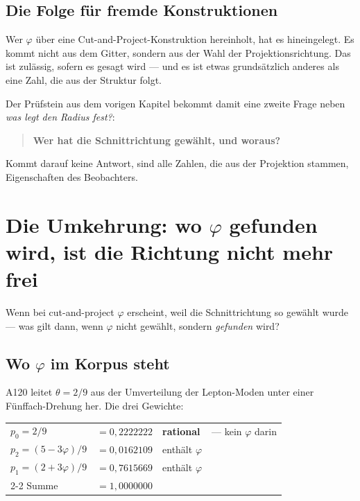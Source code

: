 \documentclass[11pt]{report}
\begin{document}
\section{Die Folge für fremde Konstruktionen}

Wer $\varphi$ über eine Cut-and-Project-Konstruktion hereinholt, hat es
hineingelegt. Es kommt nicht aus dem Gitter, sondern aus der Wahl der
Projektionsrichtung. Das ist zulässig, sofern es gesagt wird --- und es
ist etwas grundsätzlich anderes als eine Zahl, die aus der Struktur
folgt.

Der Prüfstein aus dem vorigen Kapitel bekommt damit eine zweite Frage
neben \emph{was legt den Radius fest?}:

\begin{quote}
\textbf{Wer hat die Schnittrichtung gewählt, und woraus?}
\end{quote}

Kommt darauf keine Antwort, sind alle Zahlen, die aus der Projektion
stammen, Eigenschaften des Beobachters.

\chapter{Die Umkehrung: wo \texorpdfstring{$\varphi$}{phi} gefunden
wird, ist die Richtung nicht mehr frei}

Wenn bei cut-and-project $\varphi$ erscheint, weil die Schnittrichtung
so gewählt wurde --- was gilt dann, wenn $\varphi$ nicht gewählt,
sondern \emph{gefunden} wird?

\section{Wo \texorpdfstring{$\varphi$}{phi} im Korpus steht}

A120 leitet $\theta = 2/9$ aus der Umverteilung der Lepton-Moden unter
einer Fünffach-Drehung her. Die drei Gewichte:
\begin{center}
\begin{tabular}{llll}
$p_0 = 2/9$ & $= 0{,}2222222$ & \textbf{rational} & --- kein $\varphi$ darin \\
$p_2 = (5 - 3\varphi)/9$ & $= 0{,}0162109$ & enthält $\varphi$ & \\
$p_1 = (2 + 3\varphi)/9$ & $= 0{,}7615669$ & enthält $\varphi$ & \\
\cmidrule{2-2}
Summe & $= 1{,}0000000$ & & \\
\end{tabular}
\end{center}
\end{document}
